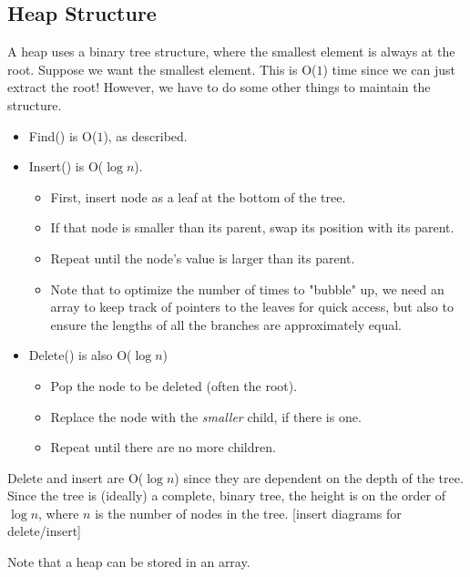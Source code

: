 \documentclass[10pt]{article}
\begin{document}
\subsection*{Heap Structure}
A heap uses a binary tree structure, where the smallest element is always at the root.  Suppose we want the smallest element.  This is O($1$) time since we can just extract the root!  However, we have to do some other things to maintain the structure.
\begin{itemize}
	\item Find() is O($1$), as described.
	\item Insert() is O($\log n$).
	\begin{itemize}
	    \item First, insert node as a leaf at the bottom of the tree.
	    \item If that node is smaller than its parent, swap its position with its parent.
	    \item Repeat until the node's value is larger than its parent.
	    \item Note that to optimize the number of times to "bubble" up, we need an array to keep track of pointers to the leaves for quick access, but also to ensure the lengths of all the branches are approximately equal.
    \end{itemize}
    \item Delete() is also O($\log n$)
    \begin{itemize}
        \item Pop the node to be deleted (often the root).
        \item Replace the node with the \textit{smaller} child, if there is one.
        \item Repeat until there are no more children.
    \end{itemize}
\end{itemize}
Delete and insert are O($\log n$) since they are dependent on the depth of the tree.  Since the tree is (ideally) a complete, binary tree, the height is on the order of $\log n$, where $n$ is the number of nodes in the tree.
[insert diagrams for delete/insert]

Note that a heap can be stored in an array.
\end{document}
